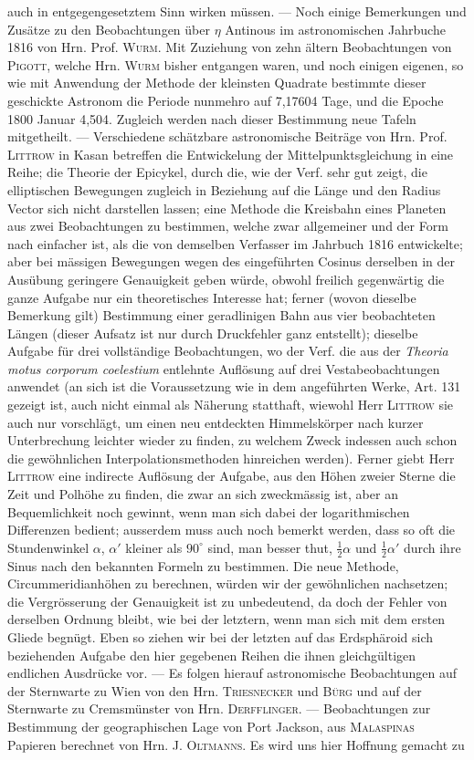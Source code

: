 \noindent auch in entgegengesetztem Sinn wirken müssen. --- Noch einige Bemerkungen und Zusätze zu den Beobachtungen über $\eta$ Antinous im astronomischen Jahrbuche 1816 von Hrn. Prof. \textsc{Wurm}. Mit Zuziehung von zehn ältern Beobachtungen von \textsc{Pigott}, welche Hrn. \textsc{Wurm} bisher entgangen waren, und noch einigen eigenen, so wie mit Anwendung der Methode der kleinsten Quadrate bestimmte dieser geschickte Astronom die Periode nunmehro auf 7,17604 Tage, und die Epoche 1800 Januar 4,504. Zugleich werden nach dieser Bestimmung neue Tafeln mitgetheilt. --- Verschiedene schätzbare astronomische Beiträge von Hrn. Prof. \textsc{Littrow} in Kasan betreffen die Entwickelung der Mittelpunktsgleichung in eine Reihe; die Theorie der Epicykel, durch die, wie der Verf. sehr gut zeigt, die elliptischen Bewegungen zugleich in Beziehung auf die Länge und den Radius Vector sich nicht darstellen lassen; eine Methode die Kreisbahn eines Planeten aus zwei Beobachtungen zu bestimmen, welche zwar allgemeiner und der Form nach einfacher ist, als die von demselben Verfasser im Jahrbuch 1816 entwickelte; aber bei mässigen Bewegungen wegen des eingeführten Cosinus derselben in der Ausübung geringere Genauigkeit geben würde, obwohl freilich gegenwärtig die ganze Aufgabe nur ein theoretisches Interesse hat; ferner (wovon dieselbe Bemerkung gilt) Bestimmung einer geradlinigen Bahn aus vier beobachteten Längen (dieser Aufsatz ist nur durch Druckfehler ganz entstellt); dieselbe Aufgabe für drei vollständige Beobachtungen, wo der Verf. die aus der \emph{Theoria motus corporum coelestium} entlehnte Auflösung auf drei Vestabeobachtungen anwendet (an sich ist die Voraussetzung wie in dem angeführten Werke, Art. 131 gezeigt ist, auch nicht einmal als Näherung statthaft, wiewohl Herr \textsc{Littrow} sie auch nur vorschlägt, um einen neu entdeckten Himmelskörper nach kurzer Unterbrechung leichter wieder zu finden, zu welchem Zweck indessen auch schon die gewöhnlichen Interpolationsmethoden hinreichen werden). Ferner giebt Herr \textsc{Littrow} eine indirecte Auflösung der Aufgabe, aus den Höhen zweier Sterne die Zeit und Polhöhe zu finden, die zwar an sich zweckmässig ist, aber an Bequemlichkeit noch gewinnt, wenn man sich dabei der logarithmischen Differenzen bedient; ausserdem muss auch noch bemerkt werden, dass so oft die Stundenwinkel $\alpha$, $\alpha'$ kleiner als $90^{\circ}$ sind, man besser thut, $\frac{1}{2}\alpha$ und $\frac{1}{2}\alpha'$ durch ihre Sinus nach den bekannten Formeln zu bestimmen. Die neue Methode, Circummeridianhöhen zu berechnen, würden wir der gewöhnlichen nachsetzen; die Vergrösserung der Genauigkeit ist zu unbedeutend, da doch der Fehler von derselben Ordnung bleibt, wie bei der letztern, wenn man sich mit dem ersten Gliede begnügt. Eben so ziehen wir bei der letzten auf das Erdsphäroid sich beziehenden Aufgabe den hier gegebenen Reihen die ihnen gleichgültigen endlichen Ausdrücke vor. --- Es folgen hierauf astronomische Beobachtungen auf der Sternwarte zu Wien von den Hrn. \textsc{Triesnecker} und \textsc{Bürg} und auf der Sternwarte zu Cremsmünster von Hrn. \textsc{Derfflinger}. --- Beobachtungen zur Bestimmung der geographischen Lage von Port Jackson, aus \textsc{Malaspinas} Papieren berechnet von Hrn. J. \textsc{Oltmanns}. Es wird uns hier Hoffnung gemacht zu 